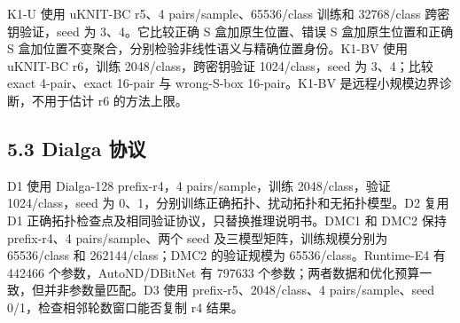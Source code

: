 \documentclass{templates/cjc-utf8}
\newcommand{\papertabletitle}{}
\newcommand{\papertablecaption}[1]{\gdef\papertabletitle{#1}}
\begin{document}
K1-U 使用 uKNIT-BC r5、4 pairs/sample、65536/class 训练和 32768/class
跨密钥验证，seed 为 3、4。它比较正确 S 盒加原生位置、错误 S
盒加原生位置和正确 S
盒加位置不变聚合，分别检验非线性语义与精确位置身份。K1-BV 使用 uKNIT-BC
r6，训练 2048/class，跨密钥验证 1024/class，seed 为 3、4；比较 exact
4-pair、exact 16-pair 与 wrong-S-box 16-pair。K1-BV
是远程小规模边界诊断，不用于估计 r6 的方法上限。

\hypertarget{dialga-ux534fux8bae}{%
\subsection{5.3 Dialga 协议}\label{dialga-ux534fux8bae}}

D1 使用 Dialga-128 prefix-r4，4 pairs/sample，训练 2048/class，验证
1024/class，seed 为 0、1，分别训练正确拓扑、扰动拓扑和无拓扑模型。D2
复用 D1 正确拓扑检查点及相同验证协议，只替换推理说明书。DMC1 和 DMC2
保持 prefix-r4、4 pairs/sample、两个 seed 及三模型矩阵，训练规模分别为
65536/class 和 262144/class；DMC2 的验证规模为 65536/class。Runtime-E4
有 442466 个参数，AutoND/DBitNet 有 797633
个参数；两者数据和优化预算一致，但并非参数量匹配。D3 使用
prefix-r5、2048/class、4 pairs/sample、seed
0/1，检查相邻轮数窗口能否复制 r4 结果。

\papertablecaption{实验矩阵与当前复核状态}
\end{document}
